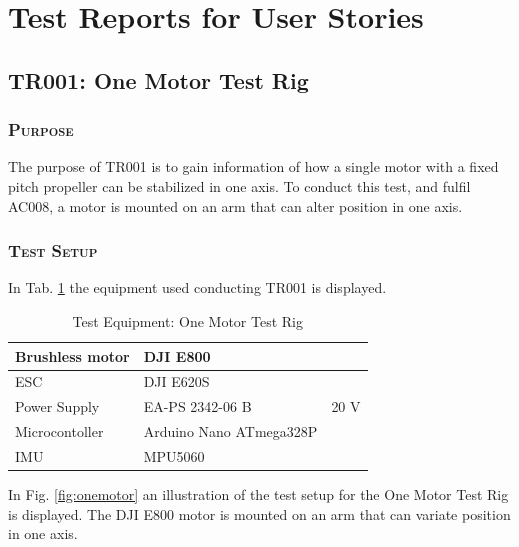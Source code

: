 \section{Test Reports for User Stories}
\subsection{TR001: One Motor Test Rig}
         {}

\subsubsection*{\textsc{\medium Purpose}}
The purpose of TR001 is to gain information of how a single motor with a fixed pitch propeller can be stabilized in one axis. To conduct this test, and fulfil AC008, a motor is mounted on an arm that can alter position in one axis. 

\subsubsection*{\textsc{\medium Test Setup}}
In Tab. \ref{tab:tabt1} the equipment used conducting TR001 is displayed. 
\begin {table}[H]
    \begin{center}
    \caption {Test Equipment: One Motor Test Rig} 
    \label{tab:tabt1} 
    \begin{tabular}{|l|l|l|}\hline 
        Brushless motor    & DJI E800   &\\ \hline
        ESC         & DJI E620S     &\\ \hline
        Power Supply & EA-PS 2342-06 B  & 20 V   \\ \hline
        Microcontoller & Arduino Nano ATmega328P &\\ \hline
        IMU & MPU5060 & \\ \hline
    \end{tabular}
    \end{center}
\end{table}

\noindent
In Fig. \ref{fig:onemotor} an illustration of the test setup for the One Motor Test Rig is displayed. The DJI E800 motor is mounted on an arm that can variate position in one axis. 

